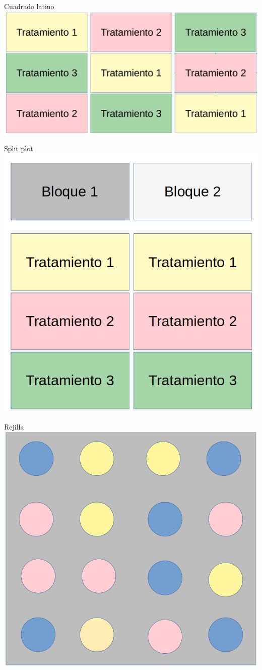 \documentclass[
  11pt,
  ignorenonframetext,
]{beamer}
\begin{document}
\begin{frame}{Cuadrado latino}
\protect\hypertarget{cuadrado-latino}{}
\includegraphics{Figuras-disenos/Cuadrado-latino.png}
\end{frame}

\begin{frame}{Split plot}
\protect\hypertarget{split-plot}{}
\includegraphics{Figuras-disenos/Split-plot.png}
\end{frame}

\begin{frame}{Rejilla}
\protect\hypertarget{rejilla}{}
\includegraphics{Figuras-disenos/Rejilla.png}
\end{frame}
\end{document}
